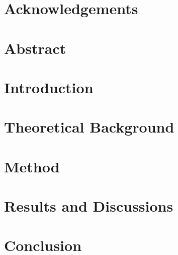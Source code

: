 \documentclass[12pt]{report}
\numberwithin{equation}{section}
\begin{document}
\newpage
{}
\chapter*{Acknowledgements}
\newpage
\tableofcontents
{}
\listoffigures

\newpage
\chapter*{Abstract}

\chapter{Introduction} %
\newpage
\chapter{Theoretical Background} %
\chapter{Method} %
\chapter{Results and Discussions} %
\chapter{Conclusion} %

%


\end{document}
